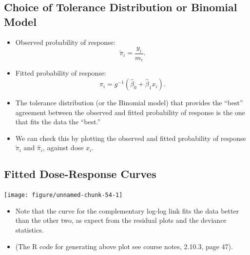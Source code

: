 \documentclass{article}\usepackage[]{graphicx}\usepackage[svgnames]{xcolor}
\newenvironment{knitrout}{}{} %
\begin{document}
\subsection*{Choice of Tolerance Distribution or Binomial Model}
\begin{itemize}
      \item Observed probability of response:
            \[ \tilde{\pi}_i=\frac{y_i}{m_i}. \]
      \item Fitted probability of response:
            \[ \hat{\pi}_i=g^{-1}(\hat{\beta}_0+\hat{\beta}_1x_i). \]
      \item The tolerance distribution (or the Binomial model) that provides the ``best''
            agreement between the observed and fitted probability of response is the one that fits the data the ``best.''
      \item We can check this by plotting the observed and fitted probability of response $ \tilde{\pi}_i $ and $ \hat{\pi}_i $,
            against dose $ x_i $.
\end{itemize}
\subsection*{Fitted Dose-Response Curves}
\begin{knitrout}
\color{fgcolor}

{\centering \texttt{[image: figure/unnamed-chunk-54-1]} 

}


\end{knitrout}
\begin{itemize}
      \item Note that the curve for the complementary log-log link fits the data better than
            the other two, as expect from the residual plots and the deviance statistics.
      \item (The R code for generating above plot see course notes, 2.10.3, page 47).
\end{itemize}
\end{document}
